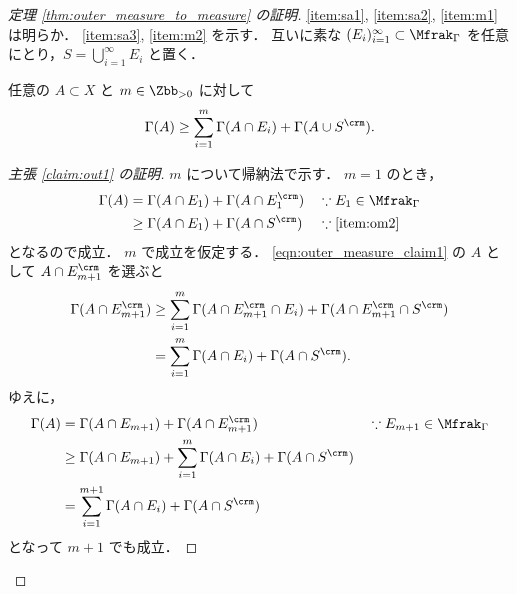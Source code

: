 \begin{proof}[定理 \ref{thm:outer_measure_to_measure} の証明]
    \ref{item:sa1}, \ref{item:sa2}, \ref{item:m1} は明らか．
    \ref{item:sa3}, \ref{item:m2} を示す．
    互いに素な $(E_i)_{i=1}^\infty\subset\Mfrak_\Gamma$ を任意にとり，$S=\bigcup_{i=1}^\infty E_i$ と置く．

    \begin{claim}\label{claim:out1}
        任意の $A\subset X$ と $m\in\Zbb_{>0}$ に対して
        \begin{align}
            \Gamma(A)\ge\sum_{i=1}^m\Gamma(A\cap E_i)+\Gamma(A\cup S^\crm).
            \label{eqn:outer_measure_claim1}
        \end{align}
    \end{claim}

    \begin{proof}[主張 \ref{claim:out1} の証明]
        $m$ について帰納法で示す．
        $m=1$ のとき，
        \begin{align*}
            \Gamma(A)
            &=\Gamma(A\cap E_1)+\Gamma(A\cap E_1^\crm)&&\because E_1\in\Mfrak_\Gamma\\
            &\ge\Gamma(A\cap E_1)+\Gamma(A\cap S^\crm)&&\because\text{\ref{item:om2}}
        \end{align*}
        となるので成立．
        $m$ で成立を仮定する．
        \eqref{eqn:outer_measure_claim1} の $A$ として $A\cap E_{m+1}^\crm$ を選ぶと
        \begin{align*}
            \Gamma(A\cap E_{m+1}^\crm)
            &\ge\sum_{i=1}^m\Gamma(A\cap E_{m+1}^\crm\cap E_i)+\Gamma(A\cap E_{m+1}^\crm\cap S^\crm)\\
            &=\sum_{i=1}^m\Gamma(A\cap E_i)+\Gamma(A\cap S^\crm).
        \end{align*}
        ゆえに，
        \begin{align*}
            \Gamma(A)
            &=\Gamma(A\cap E_{m+1})+\Gamma(A\cap E_{m+1}^\crm)&&\because E_{m+1}\in\Mfrak_\Gamma\\
            &\ge\Gamma(A\cap E_{m+1})+\sum_{i=1}^m\Gamma(A\cap E_i)+\Gamma(A\cap S^\crm)\\
            &=\sum_{i=1}^{m+1}\Gamma(A\cap E_i)+\Gamma(A\cap S^\crm)
        \end{align*}
        となって $m+1$ でも成立．
    \end{proof}


\end{proof}
